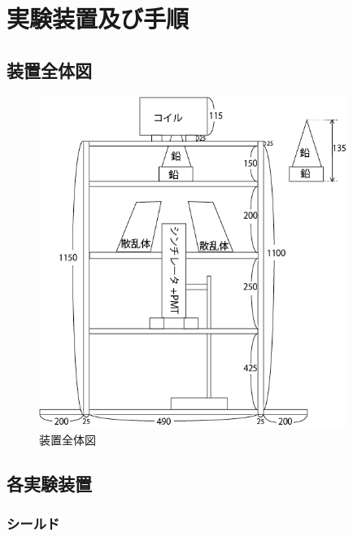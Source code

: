 \documentclass[dvipdfmx]{jreport}
\begin{document}
\chapter{実験装置及び手順}

\section{装置全体図}
\begin{figure}[htbp]
  \begin{center}
    \includegraphics[width=100mm]{figure/setup.png}
    \caption{装置全体図 \label{setup}}
  \end{center}
\end{figure}

\section{各実験装置}

\subsection{シールド}
\end{document}
